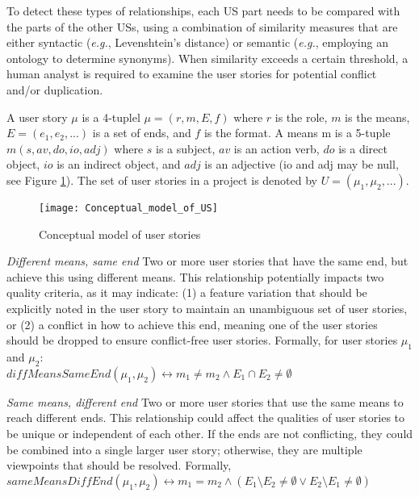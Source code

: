 To detect these types of relationships, each US part needs to be compared with the parts of the other USs, using a combination of similarity measures that are either syntactic (\emph{e.g.}, Levenshtein’s distance) or semantic (\emph{e.g.}, employing an ontology to determine synonyms). When similarity exceeds a certain threshold, a human analyst is required to examine the user stories for potential conﬂict and/or duplication.
\begin{definition}
A user story $\mu$ is a 4-tuplel $\mu=(r,m,E,f)$ where $r$ is the role, $m$ is the means, $E=(e_1, e_2, . . .)$ is a set of ends, and $f$ is the format. A means m is a 5-tuple $m (s,av,do,io,adj)$ where $s$ is a subject, $av$ is an action verb, $do$ is a direct object, $io$ is an indirect object, and $adj$ is an adjective (io and adj may be null, see Figure \ref{fig:conceptual_model}). The set of user stories in a project is denoted by $U=(\mu_1, \mu_2, . . .)$.
\end{definition}
\begin{figure}
\center
\texttt{[image: Conceptual\_model\_of\_US]}
\caption{Conceptual model of user stories \cite{lucassen2016improving}}\label{fig:conceptual_model}
\end{figure}
\begin{definition}
\emph{Different means, same end }Two or more user stories that have the same end, but achieve this using different means. This relationship potentially impacts two quality criteria, as it may indicate: (1) a feature variation that should be explicitly noted in the user story to maintain an unambiguous set of user stories, or (2) a conﬂict in how to achieve this end, meaning one of the user stories should be dropped to ensure conﬂict-free user stories. Formally, for user stories $\mu_1$ and $\mu_2$:\\ 
$diffMeansSameEnd(\mu_1,\mu_2)\leftrightarrow m_1 \neq m_2 \wedge E_1 \cap E_2 \neq \emptyset$
\end{definition}
\begin{definition}
\emph{Same means, different end} Two or more user stories that use the same means to reach different ends. This relationship could affect the qualities of user stories to be unique or independent of each other. If the ends are not conﬂicting, they could be combined into a single larger user story; otherwise, they are multiple viewpoints that should be resolved. Formally,\\ 
$sameMeansDiffEnd(\mu_1, \mu_2) \leftrightarrow m_1 = m_2 \wedge (E_1 \setminus E_2 \neq \emptyset \vee E_2 \setminus E_1 \neq \emptyset )$
\end{definition}
